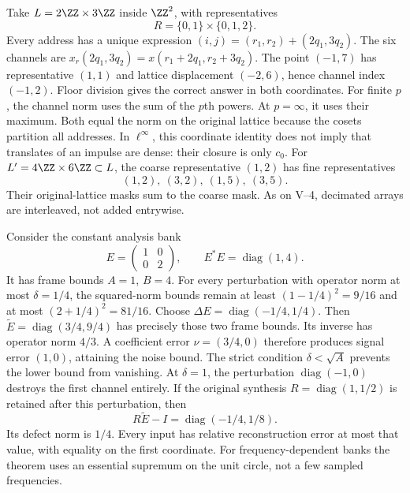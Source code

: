 Take $L=2\ZZ\times3\ZZ$ inside $\ZZ^2$, with representatives
\[
R=\{0,1\}\times\{0,1,2\}.
\]
Every address has a unique expression $(i,j)=(r_1,r_2)+(2q_1,3q_2)$. The six channels are $x_r(2q_1,3q_2)=x(r_1+2q_1,r_2+3q_2)$.
The point $(-1,7)$ has representative $(1,1)$ and lattice displacement $(-2,6)$, hence channel index $(-1,2)$. Floor division gives the correct answer in both coordinates.
For finite $p$, the channel norm uses the sum of the $p$th powers. At $p=\infty$, it uses their maximum. Both equal the norm on the original lattice because the cosets partition all addresses. In $\ell^\infty$, this coordinate identity does not imply that translates of an impulse are dense: their closure is only $c_0$.
For $L'=4\ZZ\times6\ZZ\subset L$, the coarse representative $(1,2)$ has fine representatives
\[
(1,2),\ (3,2),\ (1,5),\ (3,5).
\]
Their original-lattice masks sum to the coarse mask. As on V--4, decimated arrays are interleaved, not added entrywise.

Consider the constant analysis bank
\[
E=\begin{pmatrix}1&0\\0&2\end{pmatrix},\qquad
E^*E=\operatorname{diag}(1,4).
\]
It has frame bounds $A=1$, $B=4$. For every perturbation with operator norm at most $\delta=1/4$, the squared-norm bounds remain at least $(1-1/4)^2=9/16$ and at most $(2+1/4)^2=81/16$.
Choose $\Delta E=\operatorname{diag}(-1/4,1/4)$. Then $\widetilde E=\operatorname{diag}(3/4,9/4)$ has precisely those two frame bounds. Its inverse has operator norm $4/3$. A coefficient error $\nu=(3/4,0)$ therefore produces signal error $(1,0)$, attaining the noise bound.
The strict condition $\delta<\sqrt A$ prevents the lower bound from vanishing. At $\delta=1$, the perturbation $\operatorname{diag}(-1,0)$ destroys the first channel entirely.
If the original synthesis $R=\operatorname{diag}(1,1/2)$ is retained after this perturbation, then
\[
R\widetilde E-I=\operatorname{diag}(-1/4,1/8).
\]
Its defect norm is $1/4$. Every input has relative reconstruction error at most that value, with equality on the first coordinate. For frequency-dependent banks the theorem uses an essential supremum on the unit circle, not a few sampled frequencies.

